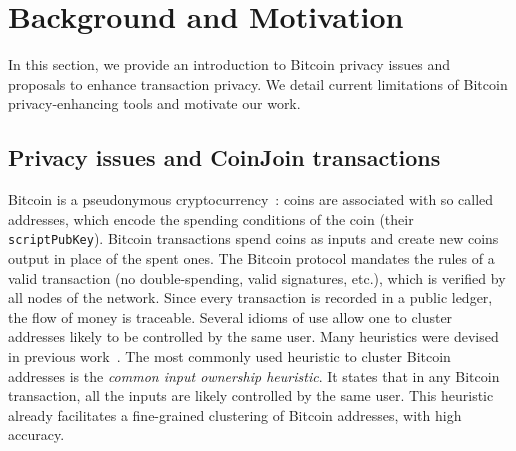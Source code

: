 \documentclass[a4paper]{article}
\begin{document}
\section{Background and Motivation} \label{sec:background}

In this section, we provide an introduction to Bitcoin privacy issues and proposals to enhance transaction privacy. We detail current limitations of Bitcoin privacy-enhancing tools and motivate our work.

\subsection{Privacy issues and CoinJoin transactions}

Bitcoin is a pseudonymous cryptocurrency~\cite{nakamoto2009bitcoin}: coins are associated with so called addresses, which encode the spending conditions of the coin (their \texttt{scriptPubKey}). Bitcoin transactions spend coins as inputs and create new coins output in place of the spent ones. The Bitcoin protocol mandates the rules of a valid transaction (no double-spending, valid signatures, etc.), which is verified by all nodes of the network. Since every transaction is recorded in a public ledger, the flow of money is traceable. Several idioms of use allow one to cluster addresses likely to be controlled by the same user. Many heuristics were devised in previous work~\cite{meiklejohn2013fistful,androulaki2013evaluating,reid2013analysis,ron2013quantitative}. The most commonly used heuristic to cluster Bitcoin addresses is the \emph{common input ownership heuristic}. It states that in any Bitcoin transaction, all the inputs are likely controlled by the same user. This heuristic already facilitates a fine-grained clustering of Bitcoin addresses, with high accuracy\cite{nick2015data}.
\end{document}
